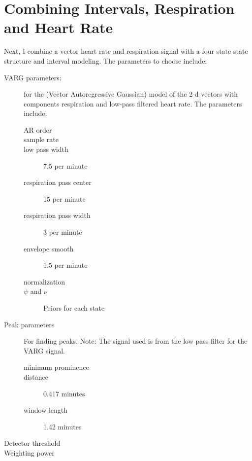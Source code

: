 \documentclass[12pt]{article}
\begin{document}
{\begin{figure}
  \centering
  \label{fig:#1_rw_study}
\end{figure}

\begin{figure}
  \centering
  \label{fig:#1_rs_study}
\end{figure}

}

\section{Combining Intervals, Respiration and Heart Rate}
\label{sec:combination}

Next, I combine a vector heart rate and respiration signal with a four
state state structure and interval modeling.  The parameters to choose
include:
\begin{description}
\item[VARG parameters:] for the (Vector Autoregressive Gaussian) model
  of the 2-d vectors with components respiration and low-pass filtered
  heart rate.  The parameters include:
  \begin{description}
  \item[AR order] %
  \item[sample rate] %
  \item[low pass width] 7.5 per minute %
  \item[respiration pass center] 15 per minute %
  \item[respiration pass width] 3 per minute %
  \item[envelope smooth] 1.5 per minute %
  \item[normalization] 
  \item[$\psi$ and $\nu$] Priors for each state
  \end{description}
\item[Peak parameters] For finding peaks.  Note: The signal used is
  from the low pass filter for the VARG signal.
  \begin{description}
  \item[minimum prominence] 
  \item[distance] 0.417 minutes
  \item[window length] 1.42 minutes
  \end{description}
\item[Detector threshold] 
\item[Weighting power] 
\end{description}
\end{document}
